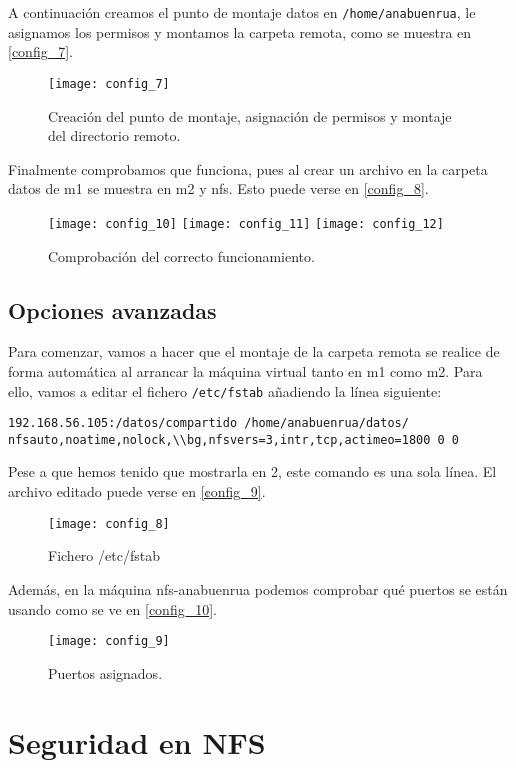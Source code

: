 A continuación creamos el punto de montaje datos en \verb|/home/anabuenrua|, le asignamos los permisos y montamos la carpeta remota, como se muestra en \eqref{config_7}.

\begin{figure}[h!]
\begin{center}
\caption{Creación del punto de montaje, asignación de permisos y montaje del directorio remoto.}
\label{config_7}
\texttt{[image: config\_7]}
\end{center}
\end{figure}

Finalmente comprobamos que funciona, pues al crear un archivo en la carpeta datos de m1 se muestra en m2 y nfs. Esto puede verse en \eqref{config_8}.

\begin{figure}[h!]
\begin{center}
\caption{Comprobación del correcto funcionamiento.}
\label{config_8}
\texttt{[image: config\_10]}
\texttt{[image: config\_11]}
\texttt{[image: config\_12]}
\end{center}
\end{figure}

\section{Opciones avanzadas}

Para comenzar, vamos a hacer que el montaje de la carpeta remota se realice de forma automática al arrancar la máquina virtual tanto en m1 como m2. Para ello, vamos a editar el fichero \verb|/etc/fstab| añadiendo la línea siguiente:

\begin{verbatim}
192.168.56.105:/datos/compartido /home/anabuenrua/datos/ nfsauto,noatime,nolock,\\bg,nfsvers=3,intr,tcp,actimeo=1800 0 0
\end{verbatim}

Pese a que hemos tenido que mostrarla en 2, este comando es una sola línea. El archivo editado puede verse en \eqref{¢onfig_9}.

\begin{figure}[h!]
\begin{center}
\caption{Fichero /etc/fstab}
\label{config_9}
\texttt{[image: config\_8]}
\end{center}
\end{figure}

Además, en la máquina nfs-anabuenrua podemos comprobar qué puertos se están usando como se ve en \eqref{config_10}.

\begin{figure}[h!]
\begin{center}
\caption{Puertos asignados.}
\label{config_10}
\texttt{[image: config\_9]}
\end{center}
\end{figure}

\chapter{Seguridad en NFS}








